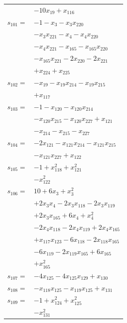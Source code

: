 \begin{longtable}{@{}r@{\;}l@{}}
 & \(\displaystyle -10x_{19} +x_{116}\) \\[3pt]
\(s_{101}=\) & \(\displaystyle -1 -x_{3} -x_{3}x_{220}\) \\
 & \(\displaystyle -x_{3}x_{221} -x_{4} -x_{4}x_{220}\) \\
 & \(\displaystyle -x_{4}x_{221} -x_{165} -x_{165}x_{220}\) \\
 & \(\displaystyle -x_{165}x_{221} -2x_{220} -2x_{221}\) \\
 & \(\displaystyle +x_{224} +x_{225}\) \\[3pt]
\(s_{102}=\) & \(\displaystyle -x_{19} -x_{19}x_{214} -x_{19}x_{215}\) \\
 & \(\displaystyle +x_{117}\) \\[3pt]
\(s_{103}=\) & \(\displaystyle -1 -x_{120} -x_{120}x_{214}\) \\
 & \(\displaystyle -x_{120}x_{215} -x_{120}x_{227} +x_{121}\) \\
 & \(\displaystyle -x_{214} -x_{215} -x_{227}\) \\[3pt]
\(s_{104}=\) & \(\displaystyle -2x_{121} -x_{121}x_{214} -x_{121}x_{215}\) \\
 & \(\displaystyle -x_{121}x_{227} +x_{122}\) \\[3pt]
\(s_{105}=\) & \(\displaystyle -1 +x_{118}^{2} +x_{121}^{2}\) \\
 & \(\displaystyle -x_{122}^{2}\) \\[3pt]
\(s_{106}=\) & \(\displaystyle 10 +6x_{3} +x_{3}^{2}\) \\
 & \(\displaystyle +2x_{3}x_{4} -2x_{3}x_{118} -2x_{3}x_{119}\) \\
 & \(\displaystyle +2x_{3}x_{165} +6x_{4} +x_{4}^{2}\) \\
 & \(\displaystyle -2x_{4}x_{118} -2x_{4}x_{119} +2x_{4}x_{165}\) \\
 & \(\displaystyle +x_{117}x_{123} -6x_{118} -2x_{118}x_{165}\) \\
 & \(\displaystyle -6x_{119} -2x_{119}x_{165} +6x_{165}\) \\
 & \(\displaystyle +x_{165}^{2}\) \\[3pt]
\(s_{107}=\) & \(\displaystyle -4x_{125} -4x_{125}x_{129} +x_{130}\) \\[3pt]
\(s_{108}=\) & \(\displaystyle -x_{118}x_{125} -x_{119}x_{125} +x_{131}\) \\[3pt]
\(s_{109}=\) & \(\displaystyle -1 +x_{124}^{2} +x_{125}^{2}\) \\
 & \(\displaystyle -x_{131}^{2}\) \\[3pt]

\end{longtable}
